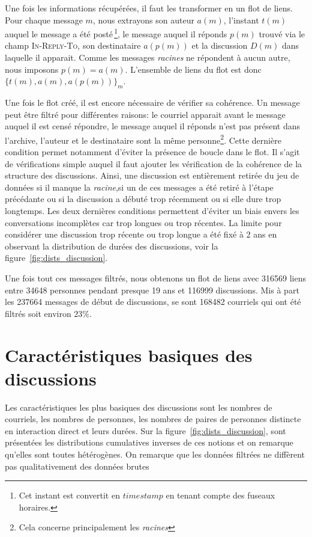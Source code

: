 Une fois les informations récupérées, il faut les transformer en un flot de liens.
Pour chaque message $m$, nous extrayons son auteur $a(m)$, l'instant $t(m)$ auquel le message a été posté\,\footnote{Cet instant est convertit en $timestamp$ en tenant compte des fuseaux horaires.}, le message auquel il réponds $p(m)$ trouvé via le champ \textsc{In-Reply-To}, son destinataire $a(p(m))$ et la discussion $D(m)$ dans laquelle il apparait.
Comme les messages \emph{racines} ne répondent à aucun autre, nous imposons $p(m)=a(m)$.
L'ensemble de liens du flot est donc $\{t(m),a(m),a(p(m))\}_m$.

Une fois le flot créé, il est encore nécessaire de vérifier sa cohérence.
Un message peut être filtré pour différentes raisons: le courriel apparait avant le message auquel il est censé répondre, le message auquel il réponds n'est pas présent dans l'archive, l'auteur et le destinataire sont la même personne\footnote{Cela concerne principalement les \emph{racines}}.
Cette dernière condition permet notamment d'éviter la présence de boucle dans le flot.
Il s'agit de vérifications simple auquel il faut ajouter les vérification de la cohérence de la structure des discussions.
Ainsi, une discussion est entièrement retirée du jeu de données si il manque la \emph{racine},si un de ces messages a été retiré à l'étape précédante ou si la discussion a débuté trop récemment ou si elle dure trop longtemps.
Les deux dernières conditions permettent d'éviter un biais envers les conversations incomplètes car trop longues ou trop récentes.
La limite pour considérer une discussion trop récente ou trop longue a été fixé à 2 ans en observant la distribution de durées des discussions, voir la figure~\ref{fig:dists_discussion}.

Une fois tout ces messages filtrés, nous obtenons un flot de liens avec 316569 liens entre 34648 personnes pendant presque 19 ans et 116999 discussions.
Mis à part les 237664 messages de début de discussions, se sont 168482 courriels qui ont été filtrés soit environ $23\%$.
\section{Caractéristiques basiques des discussions}

Les caractéristiques les plus basiques des discussions sont les nombres de courriels, les nombres de personnes, les nombres de paires de personnes distincte en interaction direct et leurs durées.
Sur la figure~\ref{fig:dists_discussion}, sont présentées les distributions cumulatives inverses de ces notions et on remarque qu'elles sont toutes hétérogènes.
On remarque que les données filtrées ne diffèrent pas qualitativement des données brutes

